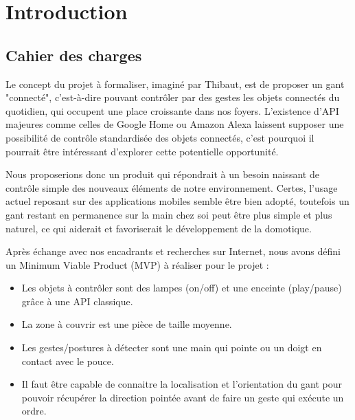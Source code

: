 \documentclass[10pt]{article}
\begin{document}
    

    
    \tableofcontents

    \section{Introduction}

        \subsection{Cahier des charges}

        Le concept du projet à formaliser, imaginé par Thibaut, est de proposer un gant "connecté", 
            c'est-à-dire pouvant contrôler par des gestes les objets connectés du quotidien,
            qui occupent une place croissante dans nos foyers. L'existence d'API majeures comme celles
            de Google Home ou Amazon Alexa laissent supposer une possibilité de contrôle standardisée
            des objets connectés, c'est pourquoi il pourrait être intéressant d'explorer cette
            potentielle opportunité.

        Nous proposerions donc un produit qui répondrait à un besoin naissant de contrôle simple des nouveaux
            éléments de notre environnement. Certes, l'usage actuel reposant sur des applications mobiles
            semble être bien adopté, toutefois un gant restant en permanence sur la main chez soi peut être plus
            simple et plus naturel, ce qui aiderait et favoriserait le développement de la domotique.

        Après échange avec nos encadrants et recherches sur Internet, nous avons défini un Minimum Viable Product (MVP)
            à réaliser pour le projet :
            \begin{itemize}
                \item Les objets à contrôler sont des lampes (on/off) et une enceinte (play/pause) grâce à une API classique.
                \item La zone à couvrir est une pièce de taille moyenne.
                \item Les gestes/postures à détecter sont une main qui pointe ou un doigt en contact avec le pouce.
                \item Il faut être capable de connaitre la localisation et l'orientation du gant pour pouvoir
                        récupérer la direction pointée
                        avant de faire un geste qui exécute un ordre.
            \end{itemize}
\end{document}
